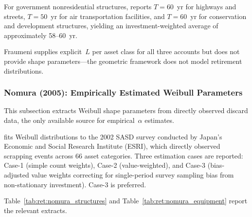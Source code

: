 For government nonresidential structures, \citet[Table~3]{Fraumeni1997} reports
$T = 60$~yr for highways and streets, $T = 50$~yr for air transportation
facilities, and $T = 60$~yr for conservation and development structures, yielding
an investment-weighted average of approximately 58--60~yr.

Fraumeni supplies explicit~$L$ per asset class for all three accounts but does
not provide shape parameters---the geometric framework does not model retirement
distributions.


\subsubsection{Nomura (2005): Empirically Estimated Weibull Parameters}
\label{app:ret:src_nomura}

This subsection extracts Weibull shape parameters from directly observed discard
data, the only available source for empirical~$\alpha$ estimates.

\citet{Nomura2005} fits Weibull distributions to the 2002 SASD survey conducted
by Japan's Economic and Social Research Institute (ESRI), which directly observed
scrapping events across 66 asset categories. Three estimation cases are reported:
Case-1 (simple count weights), Case-2 (value-weighted), and Case-3
(bias-adjusted value weights correcting for single-period survey sampling bias
from non-stationary investment). Case-3 is preferred.

Table~\ref{tab:ret:nomura_structures} and Table~\ref{tab:ret:nomura_equipment}
report the relevant extracts.


